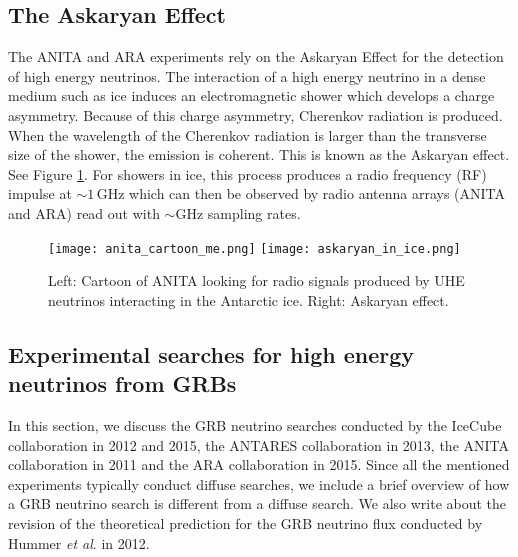 \documentclass[12pt]{article}
\begin{document}
\begin{doublespace}
\subsection{The Askaryan Effect} 

The ANITA and ARA experiments rely on the Askaryan Effect \cite{Askaryan} for the detection of high energy neutrinos. The interaction of a high energy neutrino in a dense medium such as ice induces an electromagnetic shower which develops a charge asymmetry. Because of this charge asymmetry, Cherenkov radiation is produced. When the wavelength of the Cherenkov radiation is larger than the transverse size of the shower, the emission is coherent. This is known as the Askaryan effect. See Figure \ref{anita_askaryan}. For showers in ice, this process produces a radio frequency (RF) impulse at $\sim 1 \, \mathrm{GHz}$ which can then be observed by radio antenna arrays (ANITA and ARA) read out with $\sim \mathrm{GHz}$ sampling rates. 

\begin{figure}{}
\texttt{[image: anita\_cartoon\_me.png]}
\texttt{[image: askaryan\_in\_ice.png]}
\caption{Left: Cartoon of ANITA looking for radio signals produced by UHE neutrinos interacting in the Antarctic ice. Right: Askaryan effect. }
\label{anita_askaryan}
\end{figure}

\begin{singlespace}
\section{Experimental searches for high energy neutrinos from GRBs}
\end{singlespace}
In this section, we discuss the GRB neutrino searches conducted by the IceCube collaboration in 2012 and 2015, the ANTARES collaboration in 2013, the ANITA collaboration in 2011 and the ARA collaboration in 2015. Since all the mentioned experiments typically conduct diffuse searches, we include a brief overview of how a GRB neutrino search is different from a diffuse search. We also write about the revision of the theoretical prediction for the GRB neutrino flux conducted by Hummer \textit{et al}. in 2012. 


\end{doublespace}
\end{document}
